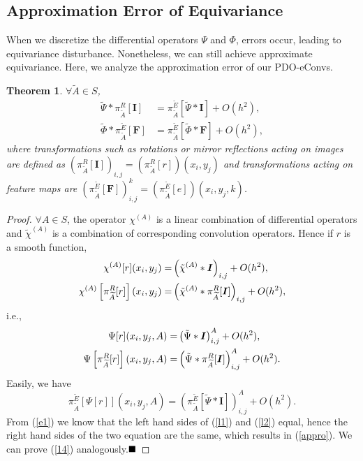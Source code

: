 \documentclass{article}
\newtheorem{theorem}{Theorem}
\newtheorem{proof}{Proof}
\begin{document}
\subsection{Approximation Error of Equivariance}
When we discretize the differential operators $\Psi$ and $\Phi$, errors occur, leading to equivariance disturbance. Nonetheless, we can still achieve approximate equivariance. Here, we analyze the approximation error of our PDO-eConvs. 



\begin{theorem}
	$\forall \tilde{A}\in S$,
	\begin{align}
	\tilde{\Psi} \ast\pi^R_{\widetilde A}[\bm{I}]&=\pi^{\tilde E}_{\widetilde A}\left[\tilde{\Psi}\ast\bm{I}\right]+O(h^2),\label{appro}\\
	\tilde{\Phi}\ast \pi^{\tilde E}_{\widetilde A}[\bm{F}]&=\pi^{\tilde E}_{\widetilde A}\left[\tilde{\Phi}\ast\bm{F}\right]+O(h^2),
	\label{14}
	\end{align}
	where transformations such as rotations or mirror reflections acting on images are defined as $(\pi^R_{\widetilde A}[\bm{I}])_{i,j}=(\pi^R_{\widetilde A}[r])(x_i,y_j)$ and transformations acting on feature maps are $(\pi^{\tilde E}_{\widetilde A}[\bm{F}])^k_{i,j}=(\pi^{\tilde E}_{\widetilde A}[e])(x_i,y_j,k)$.
\end{theorem}

\begin{proof}
	$\forall A\in S$, the operator ${\chi}^{(A)}$ is a linear combination of differential operators and $\tilde{\chi}^{(A)}$ is a combination
	of corresponding convolution operators. Hence if $r$ is a smooth function,
	\begin{align}
	\chi^{(A)} [r](x_i,y_j) =&\left(\tilde{\chi}^{(A)} \ast \bm{I}\right)_{i,j}+O(h^2),\notag\\
	\chi^{(A)} \left[\pi^R_{\widetilde A}[r]\right](x_i,y_j) =&\left(\tilde{\chi}^{(A)} \ast \pi^R_{\widetilde A}[\bm{I}]\right)_{i,j}+O(h^2),\notag
	\end{align}
	i.e.,
	\begin{align}
	\Psi [r](x_i,y_j,A) =&\left(\tilde{\Psi} \ast \bm{I}\right)^A_{i,j}+O(h^2),\notag\\
	\Psi \left[\pi^R_{\widetilde A}[r]\right](x_i,y_j,A) =&\left(\tilde{\Psi} \ast \pi^R_{\widetilde A}[\bm{I}]\right)^A_{i,j}+O(h^2).\label{l1}
	\end{align}
	Easily, we have
	\begin{equation}
	\pi^{\tilde E}_{\widetilde A}\left[\Psi [r]\right](x_i,y_j,A) =\left( \pi^{\tilde E}_{\widetilde A}\left[\tilde{\Psi} \ast \bm{I}\right]\right)^A_{i,j}+O(h^2).\label{l2}
	\end{equation}
From (\ref{e1}) we know that the left hand sides of (\ref{l1}) and (\ref{l2}) equal, hence the right hand sides of the two equation are the same, which results in (\ref{appro}). We can prove (\ref{14}) analogously.$\hfill\blacksquare$  
\end{proof}
\end{document}
